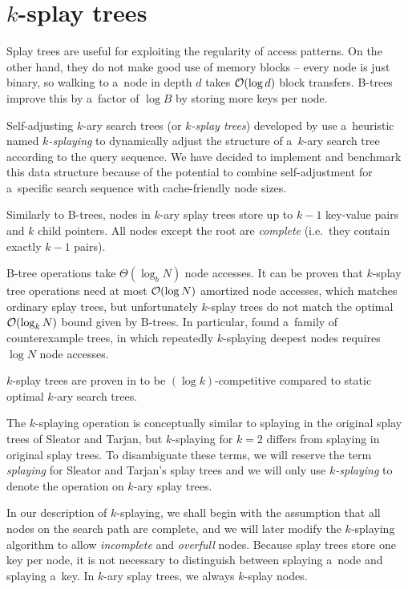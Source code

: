 \chapter{$k$-splay trees}
\label{chapter:ksplay}
Splay trees are useful for exploiting the regularity of access patterns.
On the other hand, they do not make good use of memory blocks -- every node
is just binary, so walking to a~node in depth $d$ takes $\mathcal{O}(\log d)$ block
transfers. B-trees improve this by a~factor of $\log B$ by storing more keys
per node.

Self-adjusting $k$-ary search trees (or \emph{$k$-splay trees}) developed
by \cite{ksplay-sherk} use a~heuristic named \emph{$k$-splaying}
to dynamically adjust the structure of a~$k$-ary search tree according to
the query sequence. We have decided to implement and benchmark this data
structure because of the potential to combine self-adjustment for a~specific
search sequence with cache-friendly node sizes.

Similarly to B-trees, nodes in $k$-ary splay trees store up to $k-1$ key-value
pairs and $k$ child pointers. All nodes except the root are \emph{complete}
(i.e.\ they contain exactly $k-1$ pairs).

\mbox{B-tree} operations take $\Theta(\log_b N)$ node accesses. It can be
proven that \mbox{$k$-splay} tree operations need at most $\mathcal{O}(\log N)$
amortized node accesses, which matches ordinary splay trees, but unfortunately
$k$-splay trees do not match the optimal $\mathcal{O}(\log_k N)$ bound given by B-trees.
In particular, \cite{ksplay-nonopt} found a~family of counterexample trees,
in which repeatedly $k$-splaying deepest nodes requires $\log N$ node accesses.

$k$-splay trees are proven in \cite{ksplay-sherk} to be $(\log k)$-competitive
compared to static optimal $k$-ary search trees.

The $k$-splaying operation is conceptually similar to splaying in the original
splay trees of Sleator and Tarjan, but $k$-splaying for $k=2$ differs from
splaying in original splay trees. To disambiguate these terms, we will
reserve the term \emph{splaying} for Sleator and Tarjan's splay trees and
we will only use \emph{$k$-splaying} to denote the operation
on $k$-ary splay trees.

In our description of $k$-splaying, we shall begin with the assumption that
all nodes on the search path are complete, and we will later modify
the $k$-splaying algorithm to allow \emph{incomplete} and \emph{overfull}
nodes.
Because splay trees store one key per node, it is not necessary to distinguish
between splaying a~node and splaying a~key. In $k$-ary splay trees, we always
$k$-splay nodes.

